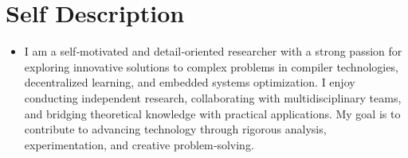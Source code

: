 \section{Self Description}
  \begin{itemize}[leftmargin=*]
    \item\small{I am a self‑motivated and detail‑oriented researcher with a strong passion for exploring innovative solutions to complex problems in compiler technologies, decentralized learning, and embedded systems optimization. I enjoy conducting independent research, collaborating with multidisciplinary teams, and bridging theoretical knowledge with practical applications. My goal is to contribute to advancing technology through rigorous analysis, experimentation, and creative problem‑solving.}
  \end{itemize}